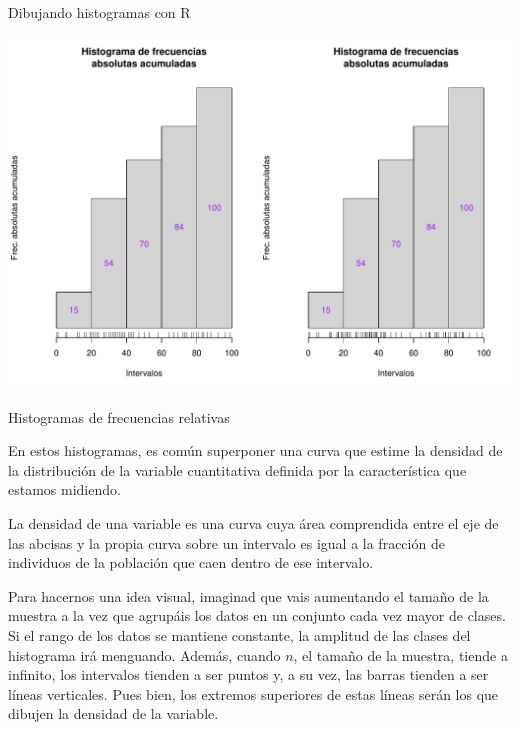 \documentclass[
  ignorenonframetext,
]{beamer}
\begin{document}
\begin{frame}{Dibujando histogramas con R}
\protect\hypertarget{dibujando-histogramas-con-r-9}{}

\includegraphics{Tema9.-Agrupacion_datos_cuantitativos_files/figure-beamer/unnamed-chunk-47-1.pdf}

\end{frame}

\begin{frame}{Histogramas de frecuencias relativas}
\protect\hypertarget{histogramas-de-frecuencias-relativas}{}

En estos histogramas, es común superponer una curva que estime la
densidad de la distribución de la variable cuantitativa definida por la
característica que estamos midiendo.

La densidad de una variable es una curva cuya área comprendida entre el
eje de las abcisas y la propia curva sobre un intervalo es igual a la
fracción de individuos de la población que caen dentro de ese intervalo.

Para hacernos una idea visual, imaginad que vais aumentando el tamaño de
la muestra a la vez que agrupáis los datos en un conjunto cada vez mayor
de clases. Si el rango de los datos se mantiene constante, la amplitud
de las clases del histograma irá menguando. Además, cuando \(n\), el
tamaño de la muestra, tiende a infinito, los intervalos tienden a ser
puntos y, a su vez, las barras tienden a ser líneas verticales. Pues
bien, los extremos superiores de estas líneas serán los que dibujen la
densidad de la variable.

\end{frame}
\end{document}

